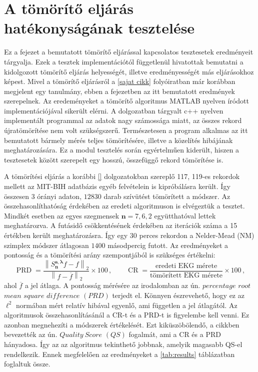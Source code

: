 \documentclass[oneside,titlepage,12pt,a4paper]{report}
\DeclareMathOperator{\PRD}{PRD}
\DeclareMathOperator{\CR}{CR}
\newcommand{\conj}[1]{\overline{#1}}
\begin{document}
\section{A tömörítő eljárás hatékonyságának tesztelése} \label{sec:methodtest}

	Ez a fejezet a bemutatott tömörítő eljárással kapcsolatos tesztesetek eredményeit tárgyalja. Ezek a tesztek implementációtól függetlenül hivatottak bemutatni a kidolgozott tömörítő eljárás helyességét, illetve eredményességét más eljárásokhoz képest. Mivel a tömörítő eljárásról a \ref{sajat cikk} folyóiratban már korábban megjelent egy tanulmány, ebben a fejezetben az itt bemutatott eredmények szerepelnek. Az eredeményeket a tömörítő algoritmus MATLAB nyelven íródott implementációjával sikerült elérni. A dolgozatban tárgyalt c++ nyelven implementált programmal az adatok nagy számossága miatt, az összes rekord újratömörítése nem volt szükségszerű. Természetesen a program alkalmas az itt bemutatott bármely mérés teljes tömörítésére, illetve a közelítés hibájának meghatározására. Ez a modul tesztelés során egyértelműen kiderült, hiszen a tesztesetek között szerepelt egy hosszú, összefüggő rekord tömörítése is. 
\par A tömörítési eljárás a korábbi \ref{} dolgozatokban szereplő 117, 119-es rekordok mellett az MIT-BIH adatbázis egyéb felvételein is kipróbálásra került. Így összesen $3$ órányi adaton, $12830$ darab szívütést tömörített a módszer. Az összehasonlíthatóság érdekében az eredeti \cite{hexp3} algoritmuson is elvégeztük a tesztet. Mindkét esetben az egyes szegmensek $\mathbf{n}=7,6,2$ együtthatóval lettek meghatározva. A futásidő csökkentésének érdekében az iterációk száma a 15 értékben került meghatározásra. Így egy $30$ perces rekordon a Nelder-Mead (NM) szimplex módszer átlagosan $1400$ másodpercig futott. Az eredményeket a pontosság és a tömörítési arány szempontjából is szükséges értékelni:
\begin{equation*}
		\PRD=\frac{\left\|S_{\mathbf{n}}^{\mathbf{a},\boldsymbol{\lambda}}f-f\right\|_2}{\left\|f-\conj{f}\right\|_2}\times 100\,,\qquad  \CR=\frac{\text{eredeti EKG mérete}}{\text{tömörített EKG mérete}}\times 100\,,
		\label{eq:prd_cr}
\end{equation*}
ahol $\conj{f}$ a jel átlaga. A pontosság mérésére az irodalomban az ún. $percentage$ $root$ $mean$ $square$ $difference$ $(PRD)$ terjedt el. Könnyen észrevehető, hogy ez az $\ell^2$ normában mért relatív hibával egyenlő, ami független a jel átlagától. Az algoritmusok összehasonlításánál a CR-t és a PRD-t is figyelembe kell venni. Ez azonban megnehezíti a módszerek értékelését. Ezt kiküszöbölendő, a \cite{pkselect} cikkben bevezették az ún. $Quality\ Score$ $(QS)$ fogalmát, ami a CR és a PRD hányadosa. Így az az algoritmus tekinthető jobbnak, amelyik magasabb QS-el rendelkezik. Ennek megfelelően az eredményeket a \ref{tab:results} táblázatban foglaltuk össze.
\end{document}
